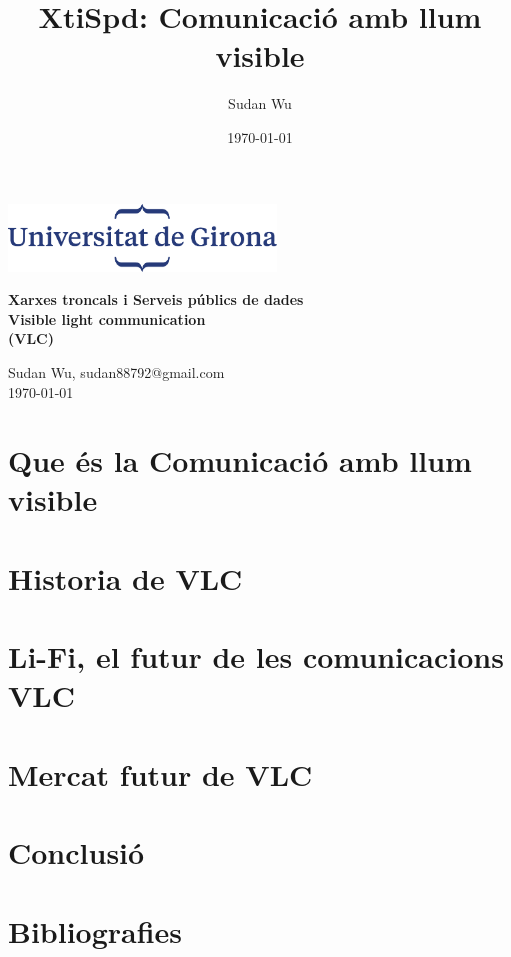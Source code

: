 \documentclass[10pt,a4paper]{article}
\title{XtiSpd: Comunicació amb llum visible}
\author{Sudan Wu}
\date{\today}
\begin{document}
\begin{titlepage}
    \begin{center}
        \includegraphics[height=1.8cm]{logoUdG}\\\vfill
    \end{center}
    \center
    {\huge \bfseries Xarxes troncals i Serveis públics de dades}\\[0.5cm]
    {\Huge \bfseries Visible light communication} \\[0.5cm]
    {\Huge \bfseries (VLC)} \\[0.5cm]

    \vfill
    \begin{center} \large
        {Sudan Wu, sudan88792@gmail.com} \\[0.25cm]
        {\today}\\ [1cm]
    \end{center}

\end{titlepage}

\tableofcontents

\clearpage

\section{Que és la Comunicació amb llum visible}

\clearpage
\section{Historia de VLC}

\clearpage
\section{Li-Fi, el futur de les comunicacions VLC}

\clearpage
\section{Mercat futur de VLC}

\clearpage

\section{Conclusió}

\clearpage

\section{Bibliografies}

\clearpage
\end{document}
